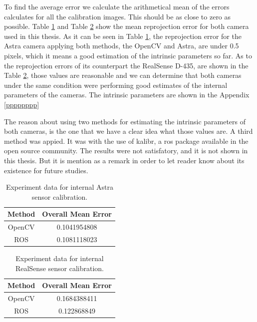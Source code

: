 To find the average error we calculate the arithmetical mean of the errors calculates for all the calibration images. This should be as close to zero as possible. 
Table \ref{astra1} and Table \ref{real1} show the mean reprojection error for both camera used in this thesis.
As it can be seen in Table \ref{astra1}, the reprojection error for the Astra camera applying both methods, the OpenCV and Astra, are under 0.5 pixels, which it means a good estimation of the intrinsic parameters so far. As to the reprojection errors of its counterpart the RealSense D-435, are shown in the Table \ref{real1}, those values are reasonable and we can determine that both cameras under the same condition were performing good estimates of the internal parameters of the cameras.  The intrinsic parameters are shown in the Appendix \ref{pppppppp}

The reason about using two methods for estimating the intrinsic parameters of both cameras, is the one that we have a clear idea what those values are.  A third method was appied. It was with the use of kalibr, a ros package available in the open source community. The results were not satisfatory, and it is not shown in this thesis. But it is mention as a remark in order to let reader know about its existence for future studies. 

\begin{table}[b]
\renewcommand{\arraystretch}{1.3}
\caption{Experiment data for internal Astra sensor calibration.}
\label{astra1}
\centering
\begin{tabular}{|c||c|}
\hline
Method & Overall Mean Error\\
\hline
OpenCV &  0.1041954808\\
\hline
ROS &  0.1081118023\\
\hline
\hline
\end{tabular}
\end{table}

\begin{table}[b]
\renewcommand{\arraystretch}{1.3}
\caption{Experiment data for internal RealSense sensor calibration.}
\label{real1}
\centering
\begin{tabular}{|c||c|}
\hline
Method & Overall Mean Error\\
\hline
OpenCV &  0.1684388411\\
\hline
ROS &  0.122868849\\
\hline
\hline
\end{tabular}
\end{table}

